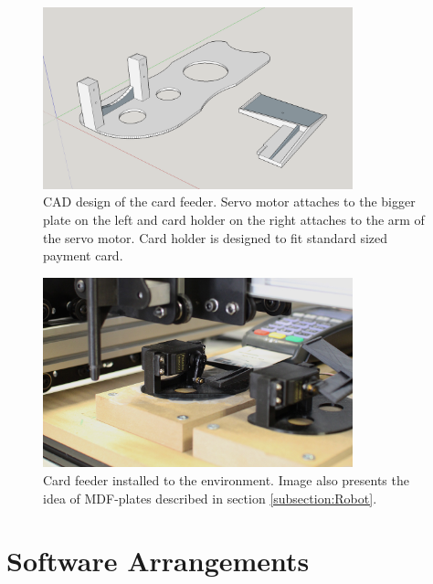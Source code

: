 \begin{figure}[ht]
  \begin{center}
    \includegraphics[width=0.8\textwidth]{images/card_feeder.png}
    \caption{CAD design of the card feeder. Servo motor attaches to the bigger plate on the left and card holder on the right attaches to the arm of the servo motor. Card holder is designed to fit standard sized payment card.}
    \label{fig:card_feeder}
  \end{center}
\end{figure}

\begin{figure}[ht]
  \begin{center}
    \includegraphics[width=0.8\textwidth]{images/card_feeder_2.jpg}
    \caption{Card feeder installed to the environment. Image also presents the idea of MDF-plates described in section \ref{subsection:Robot}.}
    \label{fig:card_feeder_2}
  \end{center}
\end{figure}
\FloatBarrier

\section{Software Arrangements}
\label{section:Software arrangements}


